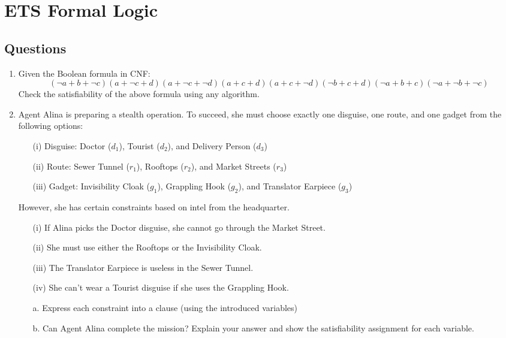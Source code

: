 \documentclass[a4paper]{article}
\theoremstyle{definition}
\begin{document}
\pagestyle{fancy}
\section*{ETS Formal Logic}

\subsection*{Questions}
\begin{enumerate}
  \item Given the Boolean formula in CNF:
        \[ (\neg a + b + \neg c)(a + \neg c + d)(a + \neg c + \neg d)(a + c + d)(a + c + \neg d)(\neg b + c + d)(\neg a + b + c)(\neg a + \neg b + \neg c) \]
        Check the satisfiability of the above formula using any algorithm.

  \item Agent Alina is preparing a stealth operation. To succeed, she must choose exactly one disguise, one route, and one gadget from the following options:
        \begin{itemize}
          \item[(i)] Disguise: Doctor ($d_1$), Tourist ($d_2$), and Delivery Person ($d_3$)
          \item[(ii)] Route: Sewer Tunnel ($r_1$), Rooftops ($r_2$), and Market Streets ($r_3$)
          \item[(iii)] Gadget: Invisibility Cloak ($g_1$), Grappling Hook ($g_2$), and Translator Earpiece ($g_3$)
        \end{itemize}
        However, she has certain constraints based on intel from the headquarter.
        \begin{itemize}
          \item[(i)] If Alina picks the Doctor disguise, she cannot go through the Market Street.
          \item[(ii)] She must use either the Rooftops or the Invisibility Cloak.
          \item[(iii)] The Translator Earpiece is useless in the Sewer Tunnel.
          \item[(iv)] She can't wear a Tourist disguise if she uses the Grappling Hook.
        \end{itemize}

        \begin{enumerate}
          \item[a.] Express each constraint into a clause (using the introduced variables)
          \item[b.] Can Agent Alina complete the mission? Explain your answer and show the satisfiability assignment for each variable.
        \end{enumerate}
\end{enumerate}
\end{document}
